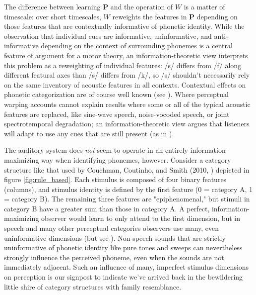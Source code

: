 \begin{multicols}{2}
The difference between learning $\mathbf{P}$ and the operation of $W$ is a matter of timescale: over short timescales, $W$ reweights the features in $\mathbf{P}$ depending on those features that are contextually informative of phonetic identity. While the observation that individual cues are informative, uninformative, and anti-informative depending on the context of surrounding phonemes is a central feature of argument for a motor theory\cite{Bailey1980}, an information-theoretic view interprets this problem as a reweighting of individual features: /s/ differs from /f/ along different featural axes than /s/ differs from /k/, so /s/ shouldn't necessarily rely on the same inventory of acoustic features in all contexts. Contextual effects on phonetic categorization are of course well known (see \cite{holtSpeechPerceptionCategorization2010a}). Where perceptual warping accounts cannot explain results where some or all of the typical acoustic features are replaced, like sine-wave speech\cite{remezSpeechPerceptionTraditional1981}, noise-vocoded speech\cite{davisLexicalInformationDrives2005}, or joint spectrotemporal degradation\cite{elliottModulationTransferFunction2009a}; an information-theoretic view argues that listeners will adapt to use any cues that are still present (as in \cite{kiefteAbsorptionReliableSpectral2008}). 

The auditory system does \textit{not} seem to operate in an entirely information-maximizing way when identifying phonemes, however. Consider a category structure like that used by Couchman, Coutinho, and Smith (2010, \cite{couchmanRulesResemblanceTheir2010}) depicted in figure \ref{fig:rule_based}. Each stimulus is composed of four binary features (columns), and stimulus identity is defined by the first feature (0 = category A, 1 = category B). The remaining three features are "epiphenomenal," but stimuli in category B have a greater sum than those in category A. A perfect, information-maximizing observer would learn to only attend to the first dimension, but in speech and many other perceptual categories observers use many, even uninformative dimensions\cite{couchmanRulesResemblanceTheir2010,roschFamilyResemblancesStudies1975} (but see \cite{leaUseMultipleDimensions2008}). Non-speech sounds that are strictly uninformative of phonetic identity like pure tones and sweeps can nevertheless strongly influence the perceived phoneme\cite{holtNeighboringSpectralContent2000,holtMeanMattersEffects2006}, even when the sounds are not immediately adjacent\cite{holtTemporallyNonadjacentNonlinguistic2005}. Such an influence of many, imperfect stimulus dimensions on perception is our signpost to indicate we've arrived back in the bewildering little shire of category structures with family resemblance.


\end{multicols}
